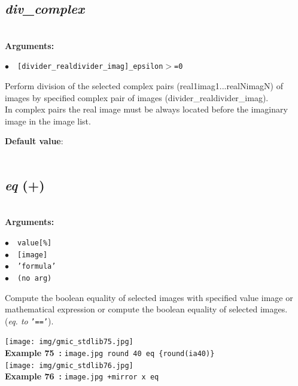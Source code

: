 \documentclass[a4paper,10.5pt,twoside]{book}
\def\comma{\discretionary{,}{}{,}}
\newcommand{\Cb}[1]{\textcolor{cb}{#1}}
\newcommand{\Cc}[1]{\textcolor{cc}{#1}}
\begin{document}
\subsection{\emph{div\_complex} }\vspace*{-0.7em}
~\\\textbf{\Cb{Arguments: }}\begin{flushleft}
{\small \Cb{\hspace*{0.5cm}$\bullet$~~\texttt{[divider\_real{\comma}divider\_imag]{\comma}\_epsilon$>$=0}}}\end{flushleft}
Perform division of the selected complex pairs (real1{\comma}imag1{\comma}...{\comma}realN{\comma}imagN) of images by specified complex pair of images (divider\_real{\comma}divider\_imag).
~\\In complex pairs{\comma} the real image must be always located before the imaginary image in the image list.
\begin{flushleft}\Cc{\textbf{Default value}:\\~\\\hspace*{0.5cm}{\small $\bullet$~~\texttt{'epsilon=1e-8'.}}}\end{flushleft}


\subsection{\emph{eq} (+)}\vspace*{-0.7em}
~\\\textbf{\Cb{Arguments: }}\begin{flushleft}
{\small \Cb{\hspace*{0.5cm}$\bullet$~~\texttt{value[\%]}}}~~~\\
{\small \Cb{\hspace*{0.5cm}$\bullet$~~\texttt{[image]}}}~~~\\
{\small \Cb{\hspace*{0.5cm}$\bullet$~~\texttt{'formula'}}}~~~\\
{\small \Cb{\hspace*{0.5cm}$\bullet$~~\texttt{(no arg)}}}\end{flushleft}
Compute the boolean equality of selected images with specified value{\comma} image or
mathematical expression{\comma} or compute the boolean equality of selected images.
~\\(\emph{eq. to} {\small \texttt{'=='}}).
\begin{center}\texttt{[image: img/gmic\_stdlib75.jpg]}\\
{\footnotesize \textbf{Example 75~:} \texttt{image.jpg round 40 eq \{round(ia{\comma}40)\}}}
\\\texttt{[image: img/gmic\_stdlib76.jpg]}\\
{\footnotesize \textbf{Example 76~:} \texttt{image.jpg +mirror x eq}}
\end{center}
\end{document}
